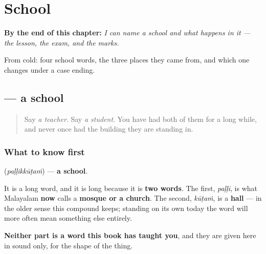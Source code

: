 
\chapter{School}
\label{ch:ml-school}

\begin{chapteropening}
\textbf{By the end of this chapter:} \emph{I can name a school and what happens in it — the lesson, the exam, and the marks.}

From cold: four school words, the three places they came from, and which one changes under a case ending.
\end{chapteropening}

\section[\texorpdfstring{\ml{പള്ളിക്കൂടം} (paḷḷikkūṭaṁ)}{പള്ളിക്കൂടം (paḷḷikkūṭaṁ)}]{ — a school}

\label{lesson:ML-C103-pallikkoodam}



\begin{quote}
Say \emph{a teacher}. Say \emph{a student}. You have had both of them for a long while, and never once had the building they are standing in.
\end{quote}

\subsection*{What to know first}
\textbf{} (\emph{paḷḷikkūṭaṁ}) — \textbf{a school}.

It is a long word, and it is long because it is \textbf{two words}. The first, \emph{paḷḷi}, is what Malayalam \textbf{now} calls a \textbf{mosque or a church}. The second, \emph{kūṭaṁ}, is a \textbf{hall} — in the older sense this compound keeps; standing on its own today the word will more often mean something else entirely.

\textbf{Neither part is a word this book has taught you}, and they are given here in sound only, for the shape of the thing.

